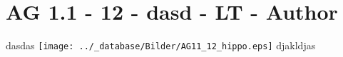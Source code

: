 \section{AG 1.1 - 12 - dasd - LT - Author}

\begin{beispiel}[AG 1.1]{1}
dasdas \texttt{[image: ../\_database/Bilder/AG11\_12\_hippo.eps]} djakldjas
\end{beispiel}